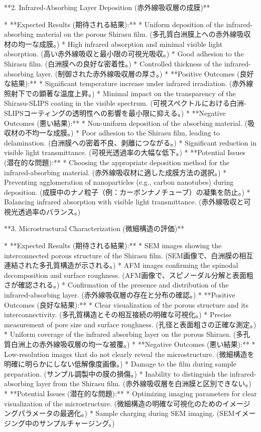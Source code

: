 \documentclass{article}
\begin{document}
**2. Infrared-Absorbing Layer Deposition (赤外線吸収層の成膜)**

*   **Expected Results (期待される結果):**
    *   Uniform deposition of the infrared-absorbing material on the porous Shirasu film. (多孔質白洲膜上への赤外線吸収材の均一な成膜。)
    *   High infrared absorption and minimal visible light absorption. (高い赤外線吸収と最小限の可視光吸収。)
    *   Good adhesion to the Shirasu film. (白洲膜への良好な密着性。)
    *   Controlled thickness of the infrared-absorbing layer. (制御された赤外線吸収層の厚さ。)
*   **Positive Outcomes (良好な結果):**
    *   Significant temperature increase under infrared irradiation. (赤外線照射下での顕著な温度上昇。)
    *   Minimal impact on the transparency of the Shirasu-SLIPS coating in the visible spectrum. (可視スペクトルにおける白洲-SLIPSコーティングの透明性への影響を最小限に抑える。)
*   **Negative Outcomes (悪い結果):**
    *   Non-uniform deposition of the absorbing material. (吸収材の不均一な成膜。)
    *   Poor adhesion to the Shirasu film, leading to delamination. (白洲膜への密着不良、剥離につながる。)
    *   Significant reduction in visible light transmittance. (可視光透過率の大幅な低下。)
*   **Potential Issues (潜在的な問題):**
    *   Choosing the appropriate deposition method for the infrared-absorbing material. (赤外線吸収材に適した成膜方法の選択。)
    *   Preventing agglomeration of nanoparticles (e.g., carbon nanotubes) during deposition. (成膜中のナノ粒子（例：カーボンナノチューブ）の凝集を防止。)
    *   Balancing infrared absorption with visible light transmittance. (赤外線吸収と可視光透過率のバランス。)

**3. Microstructural Characterization (微細構造の評価)**

*   **Expected Results (期待される結果):**
    *   SEM images showing the interconnected porous structure of the Shirasu film. (SEM画像で、白洲膜の相互連結された多孔質構造が示される。)
    *   AFM images confirming the spinodal decomposition and surface roughness. (AFM画像で、スピノーダル分解と表面粗さが確認される。)
    *   Confirmation of the presence and distribution of the infrared-absorbing layer. (赤外線吸収層の存在と分布の確認。)
*   **Positive Outcomes (良好な結果):**
    *   Clear visualization of the porous structure and its interconnectivity. (多孔質構造とその相互接続の明確な可視化。)
    *   Precise measurement of pore size and surface roughness. (孔径と表面粗さの正確な測定。)
    *   Uniform coverage of the infrared absorbing layer on the porous Shirasu. (多孔質白洲上の赤外線吸収層の均一な被覆。)
*   **Negative Outcomes (悪い結果):**
    *   Low-resolution images that do not clearly reveal the microstructure. (微細構造を明確に明らかにしない低解像度画像。)
    *   Damage to the film during sample preparation. (サンプル調製中の膜の損傷。)
    *   Inability to distinguish the infrared-absorbing layer from the Shirasu film. (赤外線吸収層を白洲膜と区別できない。)
*   **Potential Issues (潜在的な問題):**
    *   Optimizing imaging parameters for clear visualization of the microstructure. (微細構造の明確な可視化のためのイメージングパラメータの最適化。)
    *   Sample charging during SEM imaging. (SEMイメージング中のサンプルチャージング。)
\end{document}
